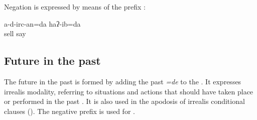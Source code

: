 Negation is expressed by means of the prefix :

\begin{exe}
	\ex	\label{ex:I will not sell them, I said analytic}
	\gll	a-d-irc-an=da	haʔ-ib=da\\
		sell	say\\
	\glt	{}
\end{exe}



\subsection{Future in the past}
\label{ssec:Future in the past}

The future in the past is formed by adding the past  \textit{=de} to the  . It expresses irrealis modality, referring to situations and actions that should have taken place or performed in the past . It is also used in the  apodosis of irrealis conditional clauses  (). The negative prefix is used for  .

